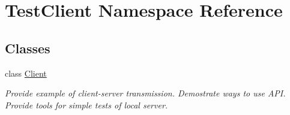 \hypertarget{namespace_test_client}{}\section{Test\+Client Namespace Reference}
\label{namespace_test_client}
\subsection*{Classes}
\begin{DoxyCompactItemize}
\item 
class \mbox{\hyperlink{class_test_client_1_1_client}{Client}}
\begin{DoxyCompactList}\small\item\em Provide example of client-\/server transmission. Demostrate ways to use A\+PI. Provide tools for simple tests of local server. \end{DoxyCompactList}\end{DoxyCompactItemize}
